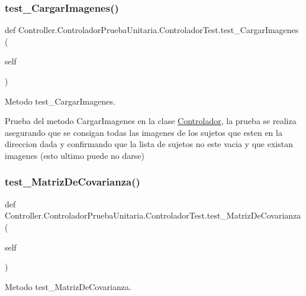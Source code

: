 \subsubsection{\texorpdfstring{test\+\_\+\+Cargar\+Imagenes()}{test\_CargarImagenes()}}
{\footnotesize\ttfamily def Controller.\+Controlador\+Prueba\+Unitaria.\+Controlador\+Test.\+test\+\_\+\+Cargar\+Imagenes (\begin{DoxyParamCaption}\item[{}]{self }\end{DoxyParamCaption})}



Metodo test\+\_\+\+Cargar\+Imagenes. 

Prueba del metodo Cargar\+Imagenes en la clase \hyperlink{namespace_controller_1_1_controlador}{Controlador}, la prueba se realiza asegurando que se consigan todas las imagenes de los sujetos que esten en la direccion dada y confirmando que la lista de sujetos no este vacia y que existan imagenes (esto ultimo puede no darse) \mbox{\label{class_controller_1_1_controlador_prueba_unitaria_1_1_controlador_test_a7bdd98073dfdcbe13627c7bee7d64f55}} 
\subsubsection{\texorpdfstring{test\+\_\+\+Matriz\+De\+Covarianza()}{test\_MatrizDeCovarianza()}}
{\footnotesize\ttfamily def Controller.\+Controlador\+Prueba\+Unitaria.\+Controlador\+Test.\+test\+\_\+\+Matriz\+De\+Covarianza (\begin{DoxyParamCaption}\item[{}]{self }\end{DoxyParamCaption})}



Metodo test\+\_\+\+Matriz\+De\+Covarianza. 

